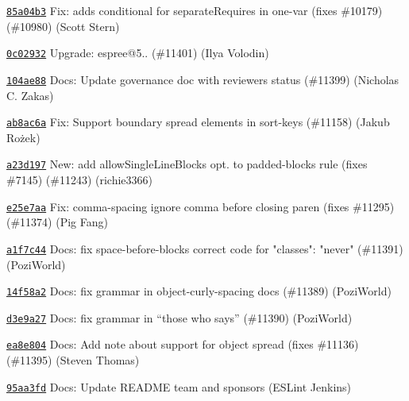 \begin{DoxyItemize}
\item \href{https://github.com/eslint/eslint/commit/85a04b319e6dfde1458174cd1d8c9e7d33da0871}{\texttt{ {\ttfamily 85a04b3}}} Fix\+: adds conditional for separate\+Requires in one-\/var (fixes \#10179) (\#10980) (Scott Stern)
\item \href{https://github.com/eslint/eslint/commit/0c02932f1b2e2a85809e84617efa1b8836c19cfb}{\texttt{ {\ttfamily 0c02932}}} Upgrade\+: espree@5.. (\#11401) (Ilya Volodin)
\item \href{https://github.com/eslint/eslint/commit/104ae881d0b21e9c64e006b2a2c21535cef0ad28}{\texttt{ {\ttfamily 104ae88}}} Docs\+: Update governance doc with reviewers status (\#11399) (Nicholas C. Zakas)
\item \href{https://github.com/eslint/eslint/commit/ab8ac6adaaf7a88e160899e7f438a4cfd655eb6e}{\texttt{ {\ttfamily ab8ac6a}}} Fix\+: Support boundary spread elements in sort-\/keys (\#11158) (Jakub Rożek)
\item \href{https://github.com/eslint/eslint/commit/a23d1975d48841eafdead1a1357e2af842f688bc}{\texttt{ {\ttfamily a23d197}}} New\+: add allow\+Single\+Line\+Blocks opt. to padded-\/blocks rule (fixes \#7145) (\#11243) (richie3366)
\item \href{https://github.com/eslint/eslint/commit/e25e7aa3ea1e8c9b3cd3242acda6d4a5572c2c6a}{\texttt{ {\ttfamily e25e7aa}}} Fix\+: comma-\/spacing ignore comma before closing paren (fixes \#11295) (\#11374) (Pig Fang)
\item \href{https://github.com/eslint/eslint/commit/a1f7c44ea9efbd9393889c1cc91b74260e0a8e02}{\texttt{ {\ttfamily a1f7c44}}} Docs\+: fix space-\/before-\/blocks correct code for "{}classes"{}\+: "{}never"{} (\#11391) (Pozi\+World)
\item \href{https://github.com/eslint/eslint/commit/14f58a2bec4d6aade0de22771c378b86b1e51959}{\texttt{ {\ttfamily 14f58a2}}} Docs\+: fix grammar in object-\/curly-\/spacing docs (\#11389) (Pozi\+World)
\item \href{https://github.com/eslint/eslint/commit/d3e9a27bbba30008a610df59e82b7192f0ecc3a3}{\texttt{ {\ttfamily d3e9a27}}} Docs\+: fix grammar in “those who says” (\#11390) (Pozi\+World)
\item \href{https://github.com/eslint/eslint/commit/ea8e8045ba0e6c1e1015104346af962f3e16fd81}{\texttt{ {\ttfamily ea8e804}}} Docs\+: Add note about support for object spread (fixes \#11136) (\#11395) (Steven Thomas)
\item \href{https://github.com/eslint/eslint/commit/95aa3fdb392d265e6c3d813d54076458e88e7ad8}{\texttt{ {\ttfamily 95aa3fd}}} Docs\+: Update README team and sponsors (ESLint Jenkins)

\end{DoxyItemize}
